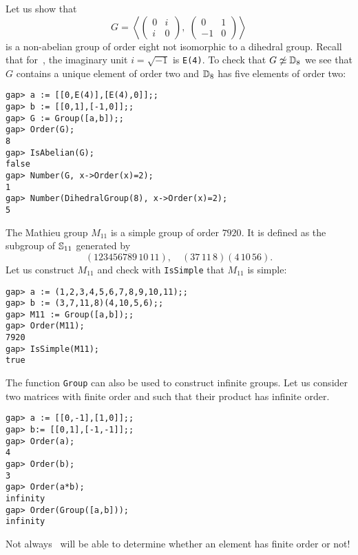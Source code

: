\begin{example}
Let us show that 
	\[
	G=\left\langle 
	\begin{pmatrix}
		0 & i\\
		i & 0
	\end{pmatrix}
	,\;
	\begin{pmatrix}
		0 & 1\\
		-1 & 0
	\end{pmatrix}\right\rangle
	\]
is a non-abelian group of order eight not isomorphic to a dihedral group.
Recall that for~\GAP, the imaginary unit $i=\sqrt{-1}$ is \lstinline{E(4)}. To
check that $G\not\simeq\mathbb{D}_8$ we see that $G$ contains a unique element of order
two and $\mathbb{D}_8$ has five elements of order two: 
\begin{lstlisting}
gap> a := [[0,E(4)],[E(4),0]];;
gap> b := [[0,1],[-1,0]];;
gap> G := Group([a,b]);;
gap> Order(G);
8
gap> IsAbelian(G);
false
gap> Number(G, x->Order(x)=2);
1
gap> Number(DihedralGroup(8), x->Order(x)=2);
5
\end{lstlisting} 
\end{example}

\begin{example}
The Mathieu group $M_{11}$ is a simple group of order $7920$. It is defined as 
the subgroup of $\mathbb{S}_{11}$ generated by 
\[
(123456789\,10\,11),\quad
(37\,11\,8)(4\,10\,56).
\]
Let us construct $M_{11}$ and check with \lstinline{IsSimple} that $M_{11}$ is
simple: 
\begin{lstlisting}
gap> a := (1,2,3,4,5,6,7,8,9,10,11);;
gap> b := (3,7,11,8)(4,10,5,6);;
gap> M11 := Group([a,b]);;
gap> Order(M11);
7920
gap> IsSimple(M11);
true
\end{lstlisting}
\end{example}

\begin{example}
The function \lstinline{Group} can also be used to construct infinite groups. 
Let us consider two matrices with finite order and such that their product has infinite order. 
\begin{lstlisting}
gap> a := [[0,-1],[1,0]];;
gap> b:= [[0,1],[-1,-1]];;
gap> Order(a);
4
gap> Order(b);
3
gap> Order(a*b);
infinity
gap> Order(Group([a,b]));
infinity
\end{lstlisting}
\end{example}

\begin{remark}
	Not always \GAP~will be able to determine whether an element has finite
	order or not! 
\end{remark}

